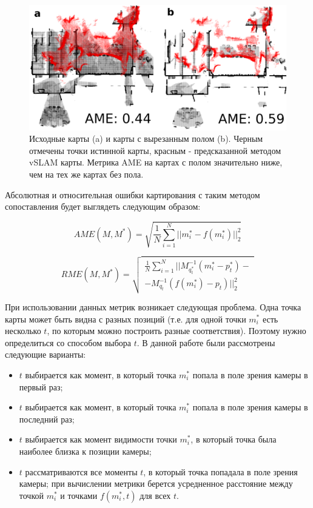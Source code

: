 \documentclass{mipt-thesis-ms}
\begin{document}
	\begin{figure}
		\includegraphics[width=1.0\textwidth]{img/1_first_paired.png}
		\caption{Исходные карты (a) и карты с вырезанным полом (b). Черным отмечены точки истинной карты, красным - предсказанной методом vSLAM карты. Метрика AME на картах с полом значительно ниже, чем на тех же картах без пола.}
		\label{figure_floor}
	\end{figure}

	Абсолютная и относительная ошибки картирования с таким методом сопоставления будет выглядеть следующим образом:
	
	\begin{equation}
		\label{eq_ame_our}
		AME(M, M^*) = \sqrt{\frac{1}{N} \sum\limits_{i=1}^N ||m_i^* - f(m_i^*)||_2^2}
	\end{equation}
	
	\begin{equation}
	\label{eq_rme_our}
	RME(M, M^*) = \sqrt{
	\begin{aligned}
	\frac{1}{N} \sum\limits_{i=1}^N ||M_{q_t^*}^{-1}(m_i^* - p_t^*) - \\
		- M_{q_t}^{-1} (f(m_i^*) - p_t)||_2^2
	\end{aligned}
	}
	\end{equation}
	
	При использовании данных метрик возникает следующая проблема. Одна точка карты может быть видна с разных позиций (т.е. для одной точки $m_i^*$ есть несколько $t$, по которым можно построить разные соответствия). Поэтому нужно определиться со способом выбора $t$. В данной работе были рассмотрены следующие варианты:
	
	\begin{itemize}
		\item $t$ выбирается как момент, в который точка $m_i^*$ попала в поле зрения камеры в первый раз;
		\item $t$ выбирается как момент, в который точка $m_i^*$ попала в поле зрения камеры в последний раз;
		\item $t$ выбирается как момент видимости точки $m_i^*$, в который точка была наиболее близка к позиции камеры;
		\item $t$ рассматриваются все моменты $t$, в который точка попадала в поле зрения камеры; при вычислении метрики берется усредненное расстояние между точкой $m_i^*$ и точками $f(m_i^*, t)$ для всех $t$.
	\end{itemize}
\end{document}
